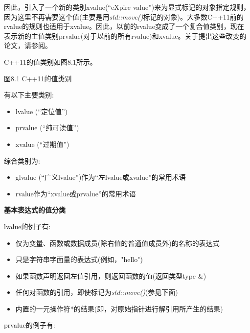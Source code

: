 因此，引入了一个新的类别xvalue(“eXpire value”)来为显式标记的对象指定规则，因为这里不再需要这个值(主要是用\textit{std::move()}标记的对象)。大多数C++11前的rvalue的规则也适用于xvalue。因此，以前的rvalue变成了一个复合值类别，现在表示新的主值类别prvalue(对于以前的所有rvalue)和xvalue。关于提出这些改变的论文，请参阅。\par


C++11的值类别如图8.1所示。\par

图8.1 C++11的值类别\par


有以下主要类别:\par

\begin{itemize}
  \item lvalue (“定位值”)
  \item prvalue (“纯可读值”)
  \item xvalue (“过期值”)
\end{itemize}

综合类别为:\par

\begin{itemize}
  \item glvalue (“广义lvalue”)作为“左lvalue或xvalue”的常用术语
  \item rvalue作为“xvalue或prvalue”的常用术语
\end{itemize}

\textbf{基本表达式的值分类}\par

lvalue的例子有:\par

\begin{itemize}
  \item 仅为变量、函数或数据成员(除右值的普通值成员外)的名称的表达式
  \item 只是字符串字面量的表达式(例如，"hello")
  \item 如果函数声明返回左值引用，则返回函数的值(返回类型type \&)
  \item 任何对函数的引用，即使标记为\textit{std::move()}(参见下面)
  \item 内置的一元操作符*的结果(即，对原始指针进行解引用所产生的结果)
\end{itemize}

prvalue的例子有:\par

